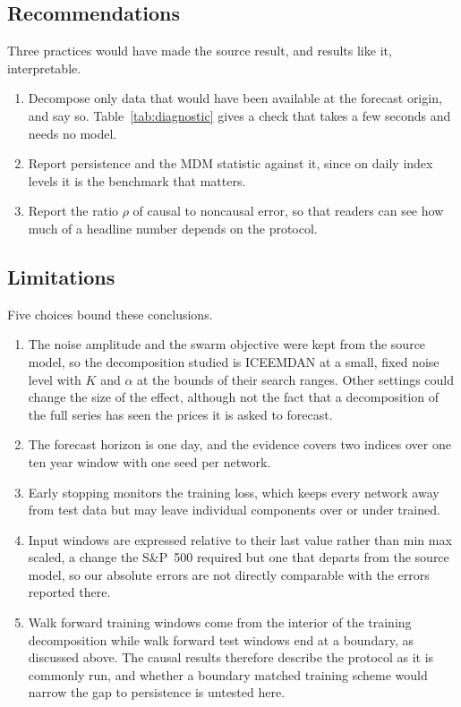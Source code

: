 \documentclass[pdflatex,sn-mathphys-num]{sn-jnl}%
\theoremstyle{thmstyleone}%
\theoremstyle{thmstyletwo}%
\theoremstyle{thmstylethree}%
\begin{document}
\subsection{Recommendations}
Three practices would have made the source result, and results like it,
interpretable.
\begin{enumerate}
\item Decompose only data that would have been available at the forecast
origin, and say so. Table~\ref{tab:diagnostic} gives a check that takes a few
seconds and needs no model.
\item Report persistence and the MDM statistic against it, since on daily
index levels it is the benchmark that matters.
\item Report the ratio $\rho$ of causal to noncausal error, so that readers
can see how much of a headline number depends on the protocol.
\end{enumerate}

\subsection{Limitations}
Five choices bound these conclusions.
\begin{enumerate}
\item The noise amplitude and the swarm objective were kept from the source
model, so the decomposition studied is ICEEMDAN at a small, fixed noise level
with $K$ and $\alpha$ at the bounds of their search ranges. Other settings
could change the size of the effect, although not the fact that a
decomposition of the full series has seen the prices it is asked to forecast.
\item The forecast horizon is one day, and the evidence covers two indices
over one ten year window with one seed per network.
\item Early stopping monitors the training loss, which keeps every network
away from test data but may leave individual components over or under
trained.
\item Input windows are expressed relative to their last value rather than
min max scaled, a change the S\&P~500 required but one that departs from the
source model, so our absolute errors are not directly comparable with the
errors reported there.
\item Walk forward training windows come from the interior of the training
decomposition while walk forward test windows end at a boundary, as discussed
above. The causal results therefore describe the protocol as it is commonly
run, and whether a boundary matched training scheme would narrow the gap to
persistence is untested here.
\end{enumerate}
\end{document}
